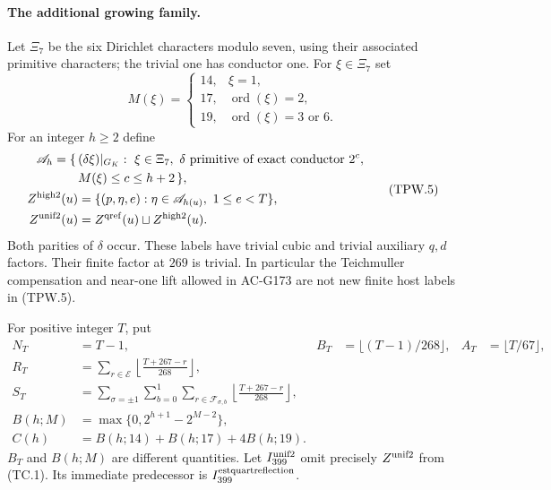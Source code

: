 \paragraph{The additional growing family.}
Let $\Xi_7$ be the six Dirichlet characters modulo seven, using their
associated primitive characters; the trivial one has conductor one.
For $\xi\in\Xi_7$ set
\[
 M(\xi)=
 \begin{cases}
 14,&\xi=1,\\
 17,&\operatorname{ord}(\xi)=2,\\
 19,&\operatorname{ord}(\xi)=3\text{ or }6.
 \end{cases}
 \tag{TPW.4}
\]
For an integer $h\geq2$ define
\[
 \begin{aligned}
 \mathscr A_h=\{\,&(\delta\xi)|_{G_K}:\ \xi\in\Xi_7,\
       \delta\text{ primitive of exact conductor }2^c,\\
       &M(\xi)\leq c\leq h+2\,\},\\
 Z^{\rm high2}(u)&=\{(p,\eta,e):\eta\in\mathscr A_{h(u)},\ 1\leq e<T\},\\
 Z^{\rm unif2}(u)&=Z^{\rm qref}(u)\sqcup Z^{\rm high2}(u).
 \end{aligned}
 \tag{TPW.5}
\]
Both parities of $\delta$ occur.  These labels have trivial cubic and
trivial auxiliary $q,d$ factors.  Their finite factor at $269$ is
trivial.  In particular the Teichmuller compensation and near-one lift
allowed in AC-G173 are not new finite host labels in (TPW.5).

For positive integer $T$, put
\[
 \begin{aligned}
 N_T&=T-1,&B_T&=\lfloor(T-1)/268\rfloor,& A_T&=\lfloor T/67\rfloor,\\
 R_T&=\sum_{r\in\mathcal E}\left\lfloor\frac{T+267-r}{268}\right\rfloor,\\
 S_T&=\sum_{\sigma=\pm1}\sum_{b=0}^1\sum_{r\in\mathcal F_{\sigma,b}}
                         \left\lfloor\frac{T+267-r}{268}\right\rfloor,\\
 B(h;M)&=\max\{0,2^{h+1}-2^{M-2}\},\\
 C(h)&=B(h;14)+B(h;17)+4B(h;19).
 \end{aligned}
 \tag{TPW.6}
\]
$B_T$ and $B(h;M)$ are different quantities.
Let $I_{399}^{\rm unif2}$ omit precisely $Z^{\rm unif2}$ from (TC.1).
Its immediate predecessor is $I_{399}^{\rm estquartreflection}$.

